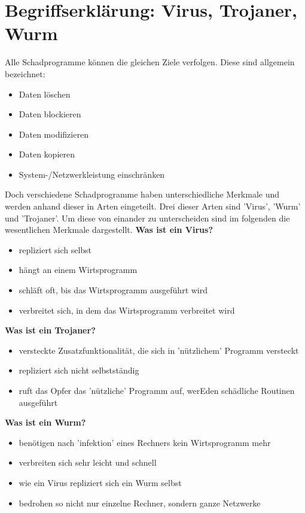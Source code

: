 \section{Begriffserklärung: Virus, Trojaner, Wurm}\label{sec:abgrenzung}
Alle Schadprogramme können die gleichen Ziele verfolgen. Diese sind allgemein bezeichnet: 
\begin{itemize}
    \item Daten löschen
    \item Daten blockieren
    \item Daten modifizieren
    \item Daten kopieren
    \item System-/Netzwerkleistung einschränken
\end{itemize} 
Doch verschiedene Schadprogramme haben unterschiedliche Merkmale und werden anhand dieser in Arten eingeteilt. 
Drei dieser Arten sind 'Virus', 'Wurm' und 'Trojaner'. Um diese von einander zu unterscheiden sind im folgenden die wesentlichen Merkmale dargestellt.
\cite{KASTRO}
\break
\textbf{Was ist ein Virus?}
\begin{itemize}
    \item repliziert sich selbst
    \item hängt an einem Wirtsprogramm
    \item schläft oft, bis das Wirtsprogramm ausgeführt wird
    \item verbreitet sich, in dem das Wirtsprogramm verbreitet wird
\end{itemize}
\textbf{Was ist ein Trojaner?}
\begin{itemize}
    \item versteckte Zusatzfunktionalität, die sich in 'nützlichem' Programm versteckt
    \item repliziert sich nicht selbstständig
    \item ruft das Opfer das 'nützliche' Programm auf, werEden schädliche Routinen ausgeführt
\end{itemize}
\textbf{Was ist ein Wurm?}
\begin{itemize}
    \item benötigen nach 'infektion' eines Rechners kein Wirtsprogramm mehr
    \item verbreiten sich sehr leicht und schnell
    \item wie ein Virus repliziert sich ein Wurm selbst
    \item bedrohen so nicht nur einzelne Rechner, sondern ganze Netzwerke
\end{itemize}
\cite{ABGVT}